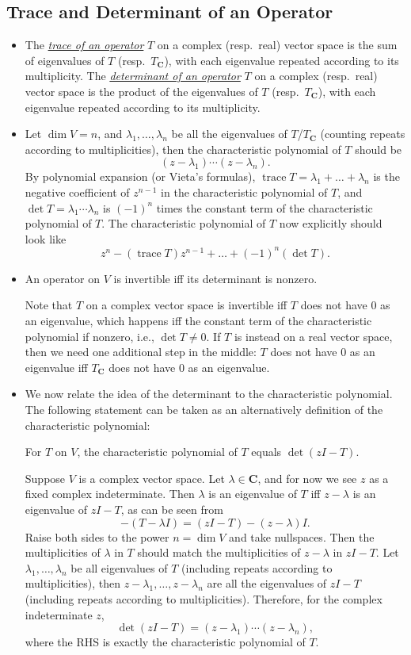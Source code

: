 \documentclass[11pt]{article}
\newcommand{\df}[1]{\ul{\textit{\textsf{#1}}}}
\newcommand{\C}{\mathbf{C}}
\renewcommand{\d}{\dim}
\newcommand{\tr}{\operatorname{trace}}
\begin{document}
\subsection{Trace and Determinant of an Operator}
\begin{itemize}
    \item The \df{trace of an operator} $T$ on a complex (resp.\ real) vector space is the sum of eigenvalues of $T$ (resp.\ $T_\C$), with each eigenvalue repeated according to its multiplicity. The \df{determinant of an operator} $T$ on a complex (resp.\ real) vector space is the product of the eigenvalues of $T$ (resp.\ $T_\C$), with each eigenvalue repeated according to its multiplicity.
    \item Let $\d V = n$, and $\lambda_1,\dots,\lambda_n$ be all the eigenvalues of $T$/$T_\C$ (counting repeats according to multiplicities), then the characteristic polynomial of $T$ should be \[(z-\lambda_1)\cdots(z-\lambda_n).\] By polynomial expansion (or Vieta's formulas), $\tr T = \lambda_1 +\dots+\lambda_n$ is the negative coefficient of $z^{n-1}$ in the characteristic polynomial of $T$, and $\det T = \lambda_1 \cdots \lambda_n$ is $(-1)^n$ times the constant term of the characteristic polynomial of $T$. The characteristic polynomial of $T$ now explicitly should look like \[z^n - (\tr T) z^{n-1} + \dots + (-1)^n (\det T).\]
    \item An operator on $V$ is invertible iff its determinant is nonzero.
    
    Note that $T$ on a complex vector space is invertible iff $T$ does not have 0 as an eigenvalue, which happens iff the constant term of the characteristic polynomial if nonzero, i.e., $\det T \neq 0$. If $T$ is instead on a real vector space, then we need one additional step in the middle: $T$ does not have 0 as an eigenvalue iff $T_\C$ does not have 0 as an eigenvalue.
    \item We now relate the idea of the determinant to the characteristic polynomial. The following statement can be taken as an alternatively definition of the characteristic polynomial: 
    \begin{center}
        For $T$ on $V$, the characteristic polynomial of $T$ equals $\det(zI - T)$.
    \end{center}
    
    Suppose $V$ is a complex vector space. Let $\lambda \in \C$, and for now we see $z$ as a fixed complex indeterminate. Then $\lambda$ is an eigenvalue of $T$ iff $z-\lambda$ is an eigenvalue of $zI - T$, as can be seen from \[-(T - \lambda I) = (zI-T) - (z-\lambda)I.\] Raise both sides to the power $n = \d V$ and take nullspaces. Then the multiplicities of $\lambda$ in $T$ should match the multiplicities of $z-\lambda$ in $zI - T$. Let $\lambda_1,\dots,\lambda_n$ be all eigenvalues of $T$ (including repeats according to multiplicities), then $z - \lambda_1, \dots,z - \lambda_n$ are all the eigenvalues of $zI - T$ (including repeats according to multiplicities). Therefore, for the complex indeterminate $z$, \[\det(zI - T) = (z - \lambda_1)\cdots(z-\lambda_n),\] where the RHS is exactly the characteristic polynomial of $T$.
    

\end{itemize}
\end{document}
